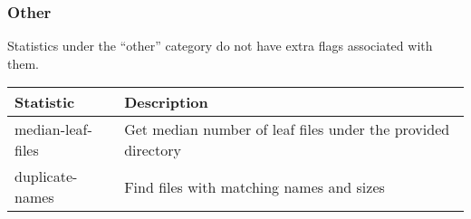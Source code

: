 \subsubsection{Other}
Statistics under the ``other'' category do not have extra flags
associated with them.
\\
\begin{table}[h!]
  \begin{tabular} {| l | l |}
    \hline
    Statistic & Description \\
    \hline
    median-leaf-files & Get median number of leaf files under the provided
    directory \\
    \hline
    duplicate-names & Find files with matching names and sizes \\
    \hline
  \end{tabular}
\end{table}
